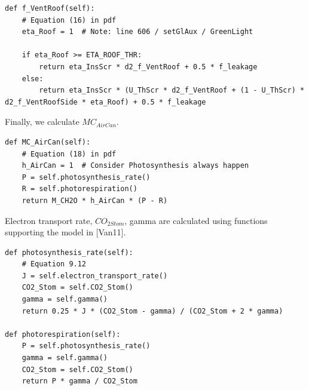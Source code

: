 \documentclass[a4paper]{article}
\numberwithin{equation}{section}
\begin{document}
\begin{mdframed}[leftline=false,rightline=false,backgroundcolor=magenta!10,nobreak=true]
  \begin{verbatim}
def f_VentRoof(self):
    # Equation (16) in pdf
    eta_Roof = 1  # Note: line 606 / setGlAux / GreenLight
    
    if eta_Roof >= ETA_ROOF_THR:
        return eta_InsScr * d2_f_VentRoof + 0.5 * f_leakage
    else:
        return eta_InsScr * (U_ThScr * d2_f_VentRoof + (1 - U_ThScr) * d2_f_VentRoofSide * eta_Roof) + 0.5 * f_leakage
  \end{verbatim}
\end{mdframed}

Finally, we calculate \(MC_{AirCan}\).
\begin{mdframed}[leftline=false,rightline=false,backgroundcolor=magenta!10,nobreak=true]
  \begin{verbatim}
def MC_AirCan(self):
    # Equation (18) in pdf
    h_AirCan = 1  # Consider Photosynthesis always happen
    P = self.photosynthesis_rate()
    R = self.photorespiration()
    return M_CH2O * h_AirCan * (P - R)
  \end{verbatim}
\end{mdframed}

Electron transport rate, \(CO_{2 Stom}\), gamma are calculated using functions supporting the model in [Van11].
\begin{mdframed}[leftline=false,rightline=false,backgroundcolor=magenta!10,nobreak=true]
  \begin{verbatim}
def photosynthesis_rate(self):
    # Equation 9.12
    J = self.electron_transport_rate()
    CO2_Stom = self.CO2_Stom()
    gamma = self.gamma()
    return 0.25 * J * (CO2_Stom - gamma) / (CO2_Stom + 2 * gamma)
    
def photorespiration(self):
    P = self.photosynthesis_rate()
    gamma = self.gamma()
    CO2_Stom = self.CO2_Stom()
    return P * gamma / CO2_Stom
  \end{verbatim}
\end{mdframed}

\newpage
\end{document}
